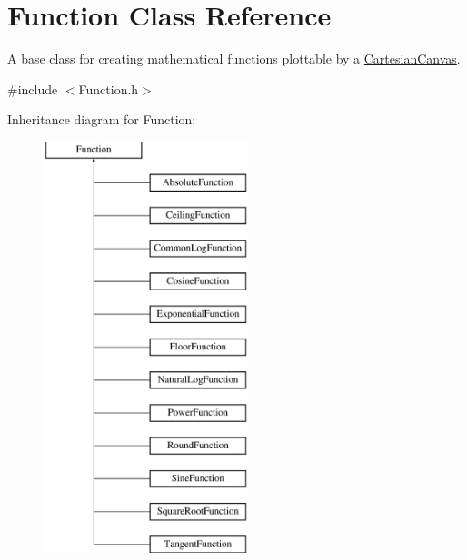 \hypertarget{class_function}{\section{Function Class Reference}
\label{class_function}
}


A base class for creating mathematical functions plottable by a \hyperlink{class_cartesian_canvas}{Cartesian\+Canvas}.  




{\ttfamily \#include $<$Function.\+h$>$}

Inheritance diagram for Function\+:\begin{figure}[H]
\begin{center}
\leavevmode
\includegraphics[height=12.000000cm]{class_function}
\end{center}
\end{figure}
